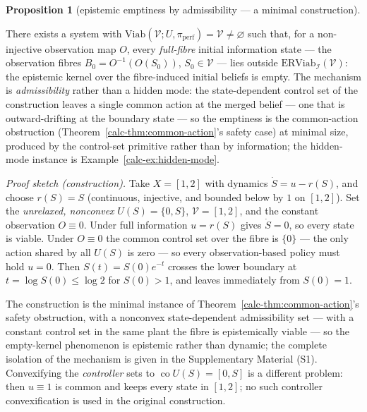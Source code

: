 \documentclass[10pt,twocolumn]{article}
\theoremstyle{definition}
\newtheorem{proposition}{Proposition}
\begin{document}
\begin{proposition}[epistemic emptiness by admissibility --- a minimal construction]\label{calc-prop:emptiness}

There exists a system with
\(\mathrm{Viab}(\mathcal{V}; U, \pi_{\mathrm{perf}}) = \mathcal{V} \neq \varnothing\)
such that, for a non-injective observation map \(O\), every \emph{full-fibre} initial information state --- the observation fibres
\(B_0 = O^{-1}(O(S_0))\), \(S_0 \in \mathcal{V}\) --- lies outside
\(\mathrm{ERViab}_{\mathcal{I}}(\mathcal{V})\): the epistemic kernel
over the fibre-induced initial beliefs is empty. The mechanism is \emph{admissibility} rather than a hidden mode: the
state-dependent control set of the construction leaves a single common
action at the merged belief --- one that is outward-drifting at the
boundary state --- so the emptiness is the common-action obstruction
(Theorem~\ref{calc-thm:common-action}'s safety case) at minimal size, produced by the control-set primitive rather than by information; the
hidden-mode instance is Example~\ref{calc-ex:hidden-mode}.

\end{proposition}

\emph{Proof sketch (construction).} Take \(X = [1,2]\) with dynamics \(\dot S = u - r(S)\), and choose \(r(S)=S\) (continuous, injective, and bounded below by \(1\) on \([1,2]\)). Set the \emph{unrelaxed, nonconvex} \(U(S) = \{0, S\}\), \(\mathcal{V} = [1,2]\), and the constant observation \(O \equiv 0\). Under full information \(u = r(S)\) gives \(\dot S = 0\), so every state is viable. Under \(O \equiv 0\) the common control set over the fibre is \(\{0\}\) --- the only action shared by all \(U(S)\) is zero --- so every observation-based policy must hold \(u=0\). Then \(S(t)=S(0)e^{-t}\) crosses the lower boundary at \(t=\log S(0)\le\log 2\) for \(S(0)>1\), and leaves immediately from \(S(0)=1\).

The construction is the minimal instance of Theorem~\ref{calc-thm:common-action}'s safety obstruction, with a nonconvex state-dependent admissibility set --- with a constant control set in the same plant the fibre is epistemically viable --- so the empty-kernel phenomenon is epistemic rather than dynamic; the complete isolation of the mechanism is given in the Supplementary Material (S1). Convexifying the \emph{controller} sets to \(\operatorname{co}U(S)=[0,S]\) is a different problem: then \(u\equiv1\) is common and keeps every state in \([1,2]\); no such controller convexification is used in the original construction.
\end{document}
